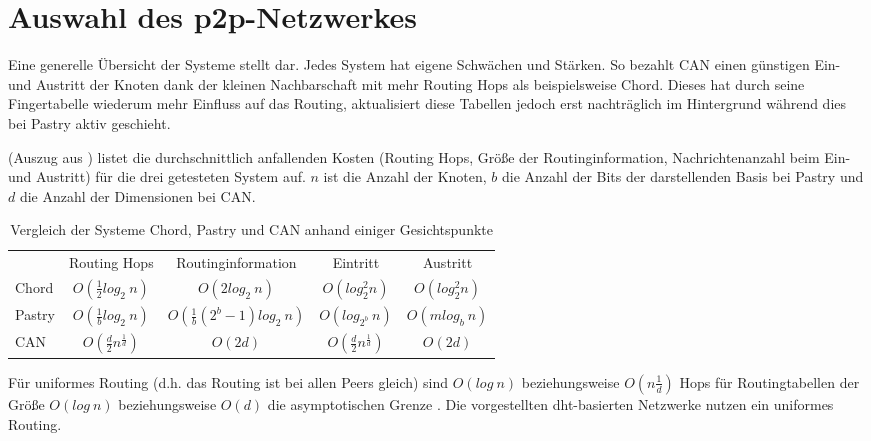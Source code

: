 



\section{Auswahl des p2p-Netzwerkes}

Eine generelle Übersicht der Systeme stellt  dar. Jedes System hat eigene Schwächen und Stärken. So bezahlt CAN einen günstigen Ein- und Austritt der Knoten dank der kleinen Nachbarschaft mit mehr Routing Hops als beispielsweise Chord. Dieses hat durch seine Fingertabelle wiederum mehr Einfluss auf das Routing, aktualisiert diese Tabellen jedoch erst nachträglich im Hintergrund während dies bei Pastry aktiv geschieht.

 (Auszug aus \cite{Goetz2005}) listet die durchschnittlich anfallenden Kosten (Routing Hops, Größe der Routinginformation, Nachrichtenanzahl beim Ein- und Austritt) für die drei getesteten System auf. $n$ ist die Anzahl der Knoten, $b$ die Anzahl der Bits der darstellenden Basis bei Pastry und $d$ die Anzahl der Dimensionen bei CAN.

\begin{table}[htbp]
\centering
\label{tab:evaluation_fazit}
\begin{tabular}{lcccc}
\toprule
 & Routing Hops & Routinginformation & Eintritt & Austritt\\ 
 \cmidrule{2-5}
Chord & $O(\frac{1}{2}log_2~n)$ & $O(2log_2~n) $ & $ O(log_2^2 n) $ & $ O(log_2^2 n) $ \\
Pastry & $O(\frac{1}{b}log_2~n)$ & $O(\frac{1}{b} (2^b-1) log_2~n) $ & $ O(log_{2^b}~n) $ & $ O(mlog_b~n) $ \\
CAN & $O(\frac{d}{2}n^\frac{1}{d})	$ & $O(2 d) $ & $ O(\frac{d}{2}n^\frac{1}{d}) $ & $ O(2 d) $ \\
\bottomrule
\end{tabular}
\caption[Vergleich der Systeme Chord, Pastry und CAN]{Vergleich der Systeme Chord, Pastry und CAN anhand einiger Gesichtspunkte}
\end{table}

Für uniformes Routing (d.h. das Routing ist bei allen Peers gleich) sind $O(log~n)$ beziehungsweise $O(n\frac{1}{d})$ Hops für Routingtabellen der Größe $O(log~n)$ beziehungsweise $O(d)$ die asymptotischen Grenze \cite{Xu2004Fundamental}. Die vorgestellten \ac{dht}-basierten Netzwerke nutzen ein uniformes Routing.


